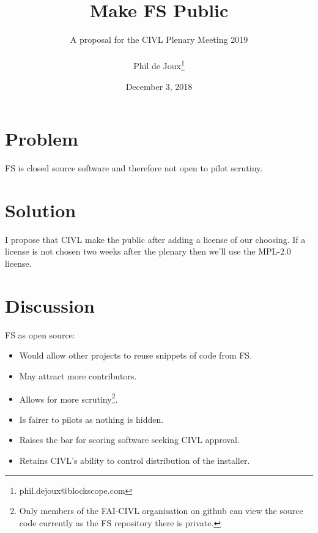 \documentclass{article}
\title{Make FS Public}
\date{December 3, 2018}
\author{A proposal for the CIVL Plenary Meeting 2019\\\\
Phil de Joux\thanks{phil.dejoux@blockscope.com}}
\begin{document}
\maketitle
\section*{Problem}
FS is closed source software and therefore not open to pilot scrutiny.

\section*{Solution}
I propose that CIVL make the  public after adding a license of our choosing. If a license is not
chosen two weeks after the plenary then we'll use the MPL-2.0 license.

\section*{Discussion}
FS as open source:\\
\begin{itemize}
    \item Would allow other projects to reuse snippets of code from FS.
    \item May attract more contributors.
    \item Allows for more scrutiny\footnote{Only members of the FAI-CIVL
    organisation on github can view the source code currently as the FS
    repository there is private.}.
    \item Is fairer to pilots as nothing is hidden.
    \item Raises the bar for scoring software seeking CIVL approval.
    \item Retains CIVL's ability to control distribution of the installer\footnotemark.
\end{itemize}
\end{document}

